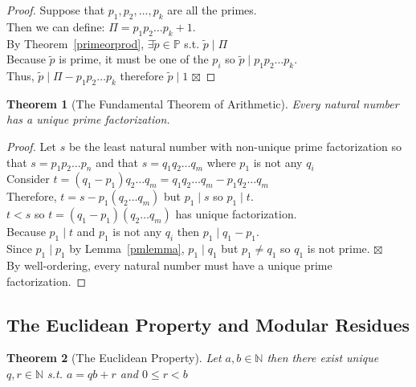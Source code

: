 \documentclass[12pt]{extarticle}
\newcommand{\cont}{$\boxtimes$}
\newcommand{\divides}{\mid}
\newcommand{\N}{\mathbb{N}}
\newcommand{\Primes}{\mathbb{P}}
\newtheorem{theorem}{Theorem}[section]
\begin{document}
\begin{proof}
Suppose that $p_1, p_2, \dots , p_k$ are all the primes.\\
Then we can define: $\Pi = p_1   p_2   \dots   p_k + 1$. \\
By Theorem~\ref{primeorprod}, $\exists \tilde{p} \in \Primes$ s.t. $\tilde{p}  \divides  \Pi$ \\
Because $\tilde{p}$ is prime, it must be one of the $p_i$ so $\tilde{p}  \divides  p_1   p_2   \dots   p_k$. \\
Thus, $\tilde{p}  \divides  \Pi - p_1   p_2   \dots   p_k$ therefore $\tilde{p}  \divides  1$ \cont
\end{proof}


\begin{theorem}[The Fundamental Theorem of Arithmetic]
\label{fundarith}
Every natural number has a unique prime factorization.
\end{theorem}

\begin{proof}
Let $s$ be the least natural number with non-unique prime factorization so that $s = p_1   p_2   \dots   p_n$ and that $s = q_1   q_2   \dots   q_m$ where $p_1$ is not any $q_i$\\
Consider $t = (q_1-p_1)   q_2   \dots   q_m = q_1   q_2   \dots   q_m - p_1   q_2   \dots   q_m$ \\
Therefore, $t = s - p_1 (q_2   \dots   q_m)$ but $p_1  \divides  s$ so $p_1 \divides t$. \\
$t < s$ so $t = (q_1-p_1) (  q_2   \dots   q_m)$ has unique factorization.\\
Because $p_1  \divides  t$ and $p_1$ is not any $q_i$ then $p_1  \divides  q_1-p_1$. \\ Since $p_1  \divides  p_1$ by Lemma~\ref{pmlemma}, $p_1 \divides q_1$ but $p_1 \neq q_1$ so $q_1$ is not prime. \cont \\ By well-ordering, every natural number must have a unique prime factorization.
\end{proof}



\subsection{The Euclidean Property and Modular Residues}

\begin{theorem}[The Euclidean Property]
\label{euclidprop}
Let $a,b \in \N$ then there exist unique $q,r \in \N$ s.t. $a = qb + r$ and $0 \le r < b$
\end{theorem}
\end{document}
